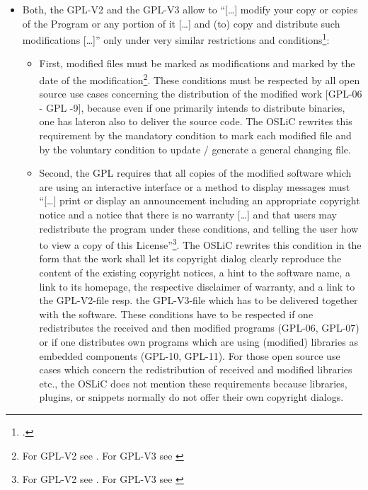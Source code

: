 \begin{itemize}
  \item Both, the GPL-V2 and the GPL-V3 allow to \enquote{[\ldots] modify your
  copy or copies of the Program or any portion of it [\ldots] and (to) copy and
  distribute such modifications [\ldots]} only under very similar restrictions
  and conditions\footcite[cf.][\nopage wp.\ §2]{Gpl20OsiLicense1991a}:
  \begin{itemize}
    \item First, modified files must be marked as modifications and marked by
    the date of the modification\footnote{For GPL-V2 see \cite[cf.][\nopage wp.\
    §2]{Gpl20OsiLicense1991a}. For GPL-V3 see \cite[cf.][\nopage wp.\
    §5]{Gpl30OsiLicense2007a}}. These conditions must be respected by all open
    source use cases concerning the distribution of the modified work [GPL-06 -
    GPL -9], because even if one primarily intends to distribute binaries, one
    has lateron also to deliver the source code. The OSLiC rewrites this
    requirement by the mandatory condition to mark each modified file and by the
    voluntary condition to update / generate a general changing file.
    
    \item Second, the GPL requires that all copies of the modified software
    which are using an interactive interface or a method to display messages
    must \enquote{[\ldots] print or display an announcement including an
    appropriate copyright notice and a notice that there is no warranty [\ldots]
    and that users may redistribute the program under these conditions, and
    telling the user how to view a copy of this License}\footnote{For GPL-V2
    see \cite[cf.][\nopage wp.\ §2c]{Gpl20OsiLicense1991a}. For GPL-V3 see
    \cite[cf.][\nopage wp.\ §5d]{Gpl30OsiLicense2007a}}. The OSLiC rewrites this
    condition in the form that the work shall let its copyright dialog clearly
    reproduce the content of the existing copyright notices, a hint to the
    software name, a link to its homepage, the respective disclaimer of
    warranty, and a link to the GPL-V2-file resp. the GPL-V3-file which has to
    be delivered together with the software. These conditions have to be
    respected if one redistributes the received and then modified programs
    (GPL-06, GPL-07) or if one distributes own programs which are using (modified)
    libraries as embedded components (GPL-10, GPL-11). For those open source use
    cases which concern the redistribution of  received and modified libraries
    etc., the OSLiC does not mention these requirements because libraries,
    plugins, or snippets normally do not offer their own copyright dialogs.
    

\end{itemize}
\end{itemize}
